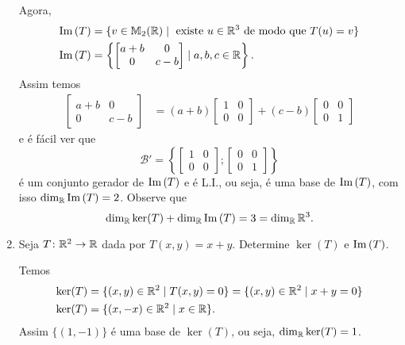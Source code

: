\begin{exemplos}
\begin{enumerate}[label={\arabic*})]
\begin{solucao}
            Agora,
            \begin{align*}
                {\rm Im\,}(T) &= \{v \in \mathbb{M}_2(\mathbb{R}) \mid \mbox{ existe } u \in \mathbb{R}^3 \mbox{ de modo que } T(u) = v\}\\
                {\rm Im\,}(T) &= \left\{ \begin{bmatrix}
                a + b & 0\\
                0 & c - b
            \end{bmatrix} \mid a, b, c \in \mathbb{R}\right\}.
            \end{align*}
            Assim temos
            \begin{align*}
                \begin{bmatrix}
                    a + b & 0\\
                    0 & c - b
                \end{bmatrix} &= (a + b)
                \begin{bmatrix}
                    1 & 0\\ 0 & 0
                 \end{bmatrix}
                  + (c - b)
                  \begin{bmatrix}
                    0 & 0\\ 0 & 1
                  \end{bmatrix}
            \end{align*}
            e é fácil ver que
            \[
                \mathcal{B}' = \left\{ \begin{bmatrix}
                1 & 0\\ 0 & 0
                \end{bmatrix}; \begin{bmatrix}
                0 & 0\\ 0 & 1
                \end{bmatrix}\right\}
            \]
            é um conjunto gerador de ${\rm Im\,}(T)$ e é L.I., ou seja, é uma base de ${\rm Im\,}(T)$, com isso $\dim_{\mathbb{R}}{\rm Im\,}(T) = 2$. Observe que
            \[
                \dim_{\mathbb{R}}\ker(T) + \dim_{\mathbb{R}}{\rm Im\,}(T) = 3 = \dim_{\mathbb{R}}\mathbb{R}^3.
            \]
        \end{solucao}

        \item Seja $T \colon \mathbb{R}^2 \to \mathbb{R}$ dada por $T(x,y) = x + y$. Determine $\ker(T)$ e ${\rm Im\,}(T)$.
        \begin{solucao}
            Temos
            \begin{align*}
                \ker(T) &= \{(x,y) \in \mathbb{R}^2 \mid T(x,y) = 0\} = \{(x,y) \in \mathbb{R}^2 \mid x + y = 0\}\\
                \ker(T) &= \{(x,-x) \in \mathbb{R}^2 \mid x \in \mathbb{R}\}.
            \end{align*}
            Assim $\{(1,-1)\}$ é uma base de $\ker(T)$, ou seja, $\dim_{\mathbb{R}}\ker(T) = 1$.


\end{solucao}
\end{enumerate}
\end{exemplos}
